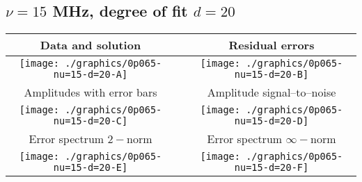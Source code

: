 

% 

\clearpage{}
\break{}

\subsection{$\nu = 15$ MHz, degree of fit $d = 20$}

\begin{table}[h]
    \begin{center}
        \begin{tabular}{ccc}
            Data and solution & \quad & Residual errors \\\hline
            \texttt{[image: ./graphics/0p065-nu=15-d=20-A]} &&
            \texttt{[image: ./graphics/0p065-nu=15-d=20-B]} \\[15pt]
            Amplitudes with error bars && Amplitude signal--to--noise \\\hline
            \texttt{[image: ./graphics/0p065-nu=15-d=20-C]} &&
            \texttt{[image: ./graphics/0p065-nu=15-d=20-D]} \\[15pt]
            Error spectrum $2-$norm && Error spectrum $\infty-$norm \\\hline
            \texttt{[image: ./graphics/0p065-nu=15-d=20-E]} &&
            \texttt{[image: ./graphics/0p065-nu=15-d=20-F]} \\[15pt]
        \end{tabular}
    \end{center}
\label{fig:elev=65, nu=15}
\end{table}



\endinput
